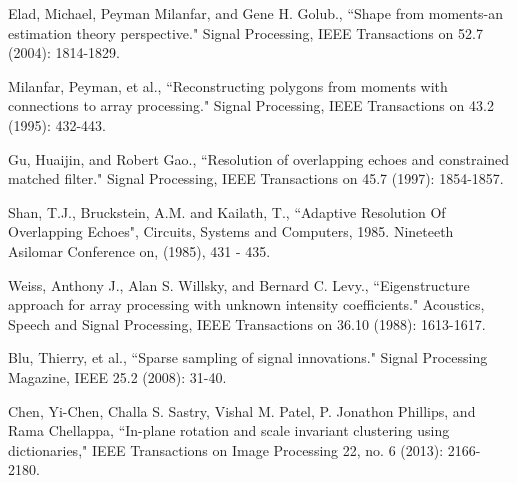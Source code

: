 \documentclass{UCF_ETD}
\begin{document}
\begin{thebibliography}{99}
Elad, Michael, Peyman Milanfar, and Gene H. Golub., ``Shape from moments-an estimation theory perspective." Signal Processing, IEEE Transactions on 52.7 (2004): 1814-1829.

Milanfar, Peyman, et al., ``Reconstructing polygons from moments with connections to array processing." Signal Processing, IEEE Transactions on 43.2 (1995): 432-443.

Gu, Huaijin, and Robert Gao., ``Resolution of overlapping echoes and constrained matched filter." Signal Processing, IEEE Transactions on 45.7 (1997): 1854-1857.

Shan, T.J., Bruckstein, A.M. and Kailath, T., ``Adaptive Resolution Of Overlapping Echoes", Circuits, Systems and Computers, 1985. Nineteeth Asilomar Conference on, (1985), 431 - 435.

Weiss, Anthony J., Alan S. Willsky, and Bernard C. Levy., ``Eigenstructure approach for array processing with unknown intensity coefficients." Acoustics, Speech and Signal Processing, IEEE Transactions on 36.10 (1988): 1613-1617.

Blu, Thierry, et al., ``Sparse sampling of signal innovations." Signal Processing Magazine, IEEE 25.2 (2008): 31-40.



Chen, Yi-Chen, Challa S. Sastry, Vishal M. Patel, P. Jonathon Phillips, and Rama Chellappa, ``In-plane rotation and scale invariant clustering using dictionaries," IEEE Transactions on Image Processing 22, no. 6 (2013): 2166-2180.

\end{thebibliography}
\end{document}
